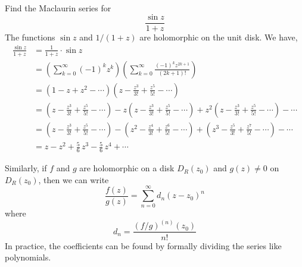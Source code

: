 \begin{example}
Find the Maclaurin series for
\[\frac{\sin z}{1 + z}\]
The functions $\sin z$ and $1/(1 + z)$ are holomorphic on the unit disk. We have,
\begin{align*}
\frac{\sin z}{1 + z} &= \frac{1}{1 + z}\cdot\sin z\\[1em]
&= \left(\sum_{k=0}^\infty(-1)^kz^k\right)\left(\sum_{k=0}^\infty\frac{(-1)^kz^{2k+1}}{(2k+1)!}\right)\\[1em]
&= \left(1 - z + z^2 - \cdots\right)\left(z - \frac{z^3}{3!} + \frac{z^5}{5!}-\cdots\right)\\[1em]
&= \left(z - \frac{z^3}{3!} + \frac{z^5}{5!}-\cdots\right) - z\left(z - \frac{z^3}{3!} + \frac{z^5}{5!}-\cdots\right) + z^2\left(z - \frac{z^3}{3!} + \frac{z^5}{5!}-\cdots\right) - \cdots\\[1em]
&= \left(z - \frac{z^3}{3!} + \frac{z^5}{5!}-\cdots\right) - \left(z^2 - \frac{z^4}{3!} + \frac{z^6}{5!}-\cdots\right) + \left(z^3 - \frac{z^5}{3!} + \frac{z^7}{5!}-\cdots\right) - \cdots\\[1em]
&= z - z^2 + \frac{5}{6}\,z^3 - \frac{5}{6}\,z^4 + \cdots
\end{align*}
\end{example}

\vspace*{1em}

\begin{discussion}\label{powserquot}
Similarly, if $f$ and $g$ are holomorphic on a disk $D_R(z_0)$ and $g(z) \neq 0$ on $D_R(z_0)$, then we can write
\[\frac{f(z)}{g(z)} = \sum_{n=0}^\infty d_n(z - z_0)^n\]
where
\[d_n = \frac{(f/g)^{(n)}(z_0)}{n!}\]
In practice, the coefficients can be found by formally dividing the series like polynomials.
\end{discussion}

\vspace*{1em}

